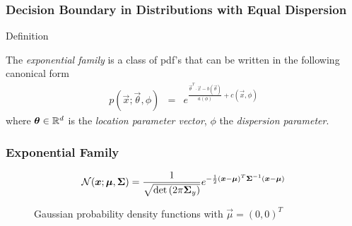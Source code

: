 \begin{frame}
  \frametitle{Decision Boundary in Distributions with Equal Dispersion \cont}

  \begin{citeblock}{Definition}
    
The {\em exponential family} is a class of pdf's that can be written in the following canonical form
    \begin{eqnarray*}
      p(\vec x;\vec \theta, \phi) &=& e^{\frac{\vec\theta^T \cdot \vec  x -b(\vec \theta)}{a(\phi)}+c(\vec x,\phi)}
    \end{eqnarray*}
    where ${\bm \theta}\in \mathbb{R}^d$ is the {\em location parameter vector}, $\phi$ the {\em dispersion parameter}.
  \end{citeblock}
\end{frame}




\begin{frame}
  \frametitle{Exponential Family}


  \begin{displaymath}
    \mathcal{N}({\bm x}; {\bm \mu},{\bm \Sigma}) = \frac{1}{ \sqrt{ \det{(2 \pi \ensuremath{{\bm \Sigma}}_y})} } 
                    e^{-\frac{1}{2} ({\bm x} - {\bm \mu})^T {\bm \Sigma}^{-1} ({\bm x} - {\bm \mu})  } 
  \end{displaymath}
%
  \begin{figure}
    \centering
    \subfloat{
      \resizebox{.3\linewidth}{!}{
               
      }
    }
    \quad
    \subfloat{
      \resizebox{.3\linewidth}{!}{
        
      }
    }
    \quad
    \subfloat{
      \resizebox{.3\linewidth}{!}{
        
      }
    }

    \caption{Gaussian probability density functions with $\vec\mu = (0, 0)^T$}
  \end{figure}
\end{frame}


